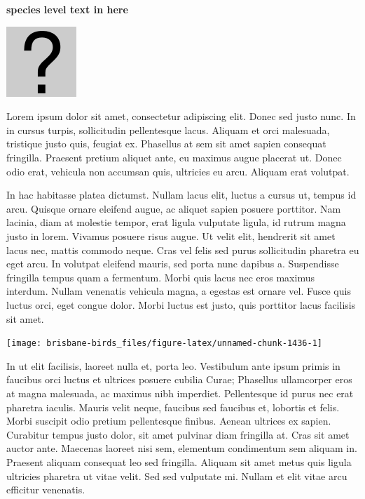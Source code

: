 \documentclass[]{book}
\let\origfigure\figure
\let\endorigfigure\endfigure
\renewenvironment{figure}[1][2] {
  \expandafter\origfigure\expandafter[H]
} {
  \endorigfigure
}
\begin{document}
\textbf{species level text in here}

\begin{figure}
\centering
\includegraphics{assets/missing.png}
\caption{No image for species}
\end{figure}

Lorem ipsum dolor sit amet, consectetur adipiscing elit. Donec sed justo
nunc. In in cursus turpis, sollicitudin pellentesque lacus. Aliquam et
orci malesuada, tristique justo quis, feugiat ex. Phasellus at sem sit
amet sapien consequat fringilla. Praesent pretium aliquet ante, eu
maximus augue placerat ut. Donec odio erat, vehicula non accumsan quis,
ultricies eu arcu. Aliquam erat volutpat.

In hac habitasse platea dictumst. Nullam lacus elit, luctus a cursus ut,
tempus id arcu. Quisque ornare eleifend augue, ac aliquet sapien posuere
porttitor. Nam lacinia, diam at molestie tempor, erat ligula vulputate
ligula, id rutrum magna justo in lorem. Vivamus posuere risus augue. Ut
velit elit, hendrerit sit amet lacus nec, mattis commodo neque. Cras vel
felis sed purus sollicitudin pharetra eu eget arcu. In volutpat eleifend
mauris, sed porta nunc dapibus a. Suspendisse fringilla tempus quam a
fermentum. Morbi quis lacus nec eros maximus interdum. Nullam venenatis
vehicula magna, a egestas est ornare vel. Fusce quis luctus orci, eget
congue dolor. Morbi luctus est justo, quis porttitor lacus facilisis sit
amet.

\begin{figure}
\texttt{[image: brisbane-birds\_files/figure-latex/unnamed-chunk-1436-1]} \caption{insert figure caption}\label{fig:unnamed-chunk-1436}
\end{figure}

In ut elit facilisis, laoreet nulla et, porta leo. Vestibulum ante ipsum
primis in faucibus orci luctus et ultrices posuere cubilia Curae;
Phasellus ullamcorper eros at magna malesuada, ac maximus nibh
imperdiet. Pellentesque id purus nec erat pharetra iaculis. Mauris velit
neque, faucibus sed faucibus et, lobortis et felis. Morbi suscipit odio
pretium pellentesque finibus. Aenean ultrices ex sapien. Curabitur
tempus justo dolor, sit amet pulvinar diam fringilla at. Cras sit amet
auctor ante. Maecenas laoreet nisi sem, elementum condimentum sem
aliquam in. Praesent aliquam consequat leo sed fringilla. Aliquam sit
amet metus quis ligula ultricies pharetra ut vitae velit. Sed sed
vulputate mi. Nullam et elit vitae arcu efficitur venenatis.
\end{document}
